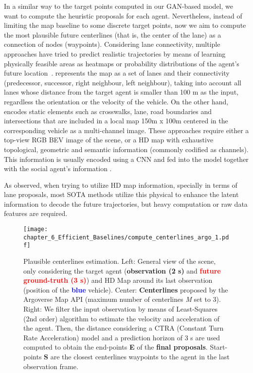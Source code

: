 In a similar way to the target points computed in our \ac{GAN}-based model, we want to compute the heuristic proposals for each agent. Nevertheless, instead of limiting the map baseline to some discrete target points, now we aim to compute the most plausible future centerlines (that is, the center of the lane) as a connection of nodes (waypoints). Considering lane connectivity, multiple approaches have tried to predict realistic trajectories by means of learning physically feasible areas as heatmaps or probability distributions of the agent’s future location~\cite{dendorfer2020goal, sadeghian2019sophie, gilles2021home}. \cite{liang2020learning} represents the map as a set of lanes and their connectivity (predecessor, successor, right neighbour, left neighbour), taking into account all lanes whose distance from the target agent is smaller than 100 m as the input, regardless the orientation or the velocity of the vehicle. On the other hand, \cite{djuric2021multixnet} encodes static elements such as crosswalks, lane, road boundaries and intersections that are included in a local map 150m x 100m centered in the corresponding vehicle  as a multi-channel image.  These approaches require either a top-view RGB \ac{BEV} image of the scene, or a HD map with exhaustive topological, geometric and semantic information (commonly codified as channels). This information is usually encoded using a \ac{CNN} and fed into the model together with the social agent's information \cite{dendorfer2020goal, sadeghian2019sophie, gao2020vectornet}. 

As observed, when trying to utilize HD map information, specially in terms of lane proposals, most SOTA methods utilize this physical to enhance the latent information to decode the future trajectories, but heavy computation or raw data features are required. 

\begin{figure*}[]
	\centering
	\texttt{[image: chapter\_6\_Efficient\_Baselines/compute\_centerlines\_argo\_1.pdf]}
	\captionsetup{justification=justified}
	\caption[Plausible centerlines estimation in Argoverse 1]{Plausible centerlines estimation. Left: General view of the scene, only considering the target agent (\textbf{\textcolor{YellowOrange}{observation (2 s)}} and \textbf{\textcolor{red}{future ground-truth (3 s)}}) and HD Map around its last observation (position of the \textbf{\textcolor{blue}{blue}} vehicle). Center: \textbf{Centerlines} proposed by the Argoverse Map API (maximum number of centerlines \textit{M} set to 3). Right: We filter the input observation by means of Least-Squares (2nd order) algorithm to estimate the velocity and acceleration of the agent. Then, the distance considering a CTRA (Constant Turn Rate Acceleration) model and a prediction horizon of 3 s are used computed to obtain the end-points \textbf{E} of the \textbf{final proposals}. Start-points \textbf{S} are the closest centerlines waypoints to the agent in the last observation frame.}
	\label{fig:chapter_6_Efficient_Baselines/efficient_baselines_hdmap_filtering}
\end{figure*}

